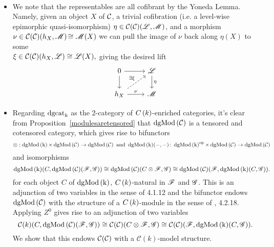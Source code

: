 \documentclass[dissertation.tex]{subfiles}
\begin{document}
\begin{rmk}
  \ \\
  \begin{itemize}
  \item
    We note that the representables are all cofibrant by the Yoneda Lemma.
    Namely, given an object $X$ of $\mathcal{C}$, a trivial cofibration (i.e. a level-wise epimorphic quasi-isomorphism) 
    $\eta \in \mathcal{C}(\mathcal{C})(\mathscr{L},\mathscr{M})$,
    and a morphism 
    $\nu \in \mathcal{C}(\mathcal{C})(h_X, \mathscr{M})$$ \cong \mathscr{M}(X)$ 
    we can pull the image of $\nu$ back along $\eta(X)$ to some\\
    $\xi \in \mathcal{C}(\mathcal{C})(h_X, \mathscr{L}) \cong \mathscr{L}(X),$
    giving the desired lift
    $$\begin{tikzcd}
      0 \arrow{r}\arrow{d} & \funct{L}\arrow{d}{\eta}\\
      h_X \arrow{r}{\nu}\arrow[dashed]{ur}{\exists \xi} & \funct{M}
    \end{tikzcd}$$
  \item
    Regarding $\operatorname{dgcat}_k$ as the 2-category of $C\left(k\right)$-enriched categories, it's clear from Proposition~\ref{modulesaretensored} that $\operatorname{dgMod\left(\mathcal{C}\right)}$ is a tensored and cotensored category, which gives rise to bifunctors
    $$\otimes: \cdg{k} \times \cdg{\C} \to \cdg{\C}\ \text{and}\ \cdg{k}(-,-) \colon \cdg{k}^\text{op} \times \cdg{\C} \to \cdg{\C}$$
    and isomorphisms 
    $$\operatorname{dgMod\left(k\right)}(C, \operatorname{dgMod\left(\mathcal{C}\right)}(\mathscr{F}, \mathscr{G})) 
    \cong \operatorname{dgMod\left(\mathcal{C}\right)}(C \otimes \mathscr{F}, \mathscr{G})
    \cong \operatorname{dgMod\left(\mathcal{C}\right)}(\mathscr{F}, \operatorname{dgMod\left(k\right)}(C,\mathscr{G})).$$
    for each object $C$ of $\operatorname{dgMod\left(k\right)}$, $C\left(k\right)$-natural in $\mathscr{F}$ and $\mathscr{G}$.
    This is an adjunction of two variables in the sense of \cite{Hovey98} 4.1.12 and the bifunctor endows $\operatorname{dgMod\left(\mathcal{C}\right)}$ with the structure of a $C\left(k\right)$-module in the sense of \cite{Hovey98}, 4.2.18.
    Applying $Z^0$ gives rise to an adjunction of two variables
    $$\mathcal{C}(k)(C, \operatorname{dgMod\left(\mathcal{C}\right)}(\mathscr{F},\mathscr{G}))
    \cong \mathcal{C}(\mathcal{C})(C \otimes \mathscr{F}, \mathscr{G})
    \cong \mathcal{C}(\mathcal{C})(\mathscr{F}, \operatorname{dgMod\left(k\right)}(C,\mathscr{G})).$$
    We show that this endows $\mathcal{C}(\mathcal{C})$ with a $\mathcal{C}(k)$-model structure.
    

\end{itemize}
\end{rmk}
\end{document}
